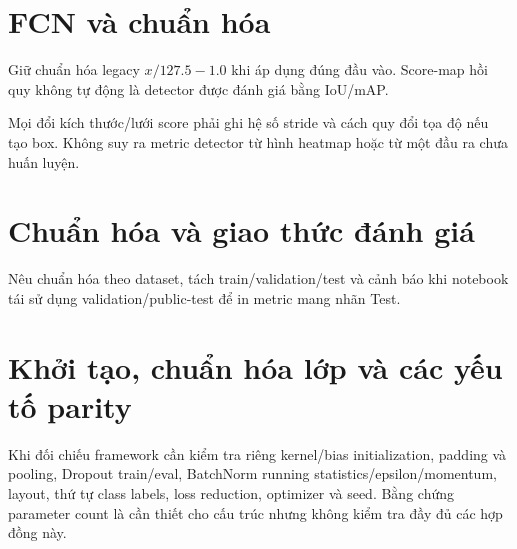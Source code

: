\section{FCN và chuẩn hóa}
Giữ chuẩn hóa legacy $x/127.5-1.0$ khi áp dụng đúng đầu vào. Score-map hồi quy không tự động là detector được đánh giá bằng IoU/mAP.

Mọi đổi kích thước/lưới score phải ghi hệ số stride và cách quy đổi tọa độ nếu tạo box. Không suy ra metric detector từ hình heatmap hoặc từ một đầu ra chưa huấn luyện.

\section{Chuẩn hóa và giao thức đánh giá}
Nêu chuẩn hóa theo dataset, tách train/validation/test và cảnh báo khi notebook tái sử dụng validation/public-test để in metric mang nhãn Test.

\section{Khởi tạo, chuẩn hóa lớp và các yếu tố parity}
Khi đối chiếu framework cần kiểm tra riêng kernel/bias initialization, padding và pooling, Dropout train/eval, BatchNorm running statistics/epsilon/momentum, layout, thứ tự class labels, loss reduction, optimizer và seed. Bằng chứng parameter count là cần thiết cho cấu trúc nhưng không kiểm tra đầy đủ các hợp đồng này.